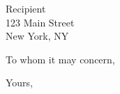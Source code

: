 \documentclass[11pt]{letter}
\begin{document}
\signature{Kyle Daniel Suarez \\ Department of Computer Science \\
Rutgers University \\ New Brunswick, New Jersey}

\begin{letter}{Recipient \\ 123 Main Street \\ New York, NY}

\opening{To whom it may concern,}

\closing{Yours,}
\end{letter}
\end{document}
